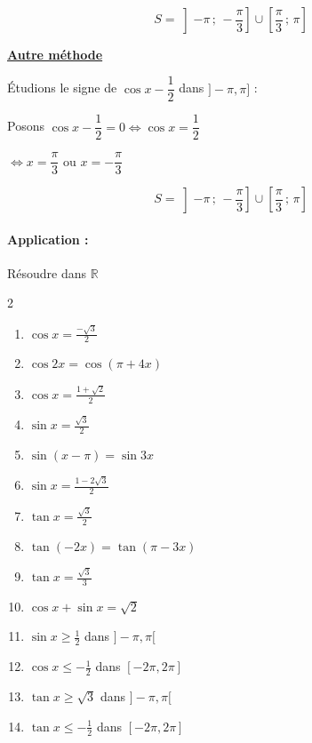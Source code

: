 \documentclass[12pt,a4paper]{article}
\begin{document}
\[
S = \left] -\pi\,;\, -\frac{\pi}{3} \right] \cup \left[ \frac{\pi}{3}\,;\, \pi \right]
\]

\begin{center}
    \underline{\textbf{\Large Autre méthode}}
\end{center}

\vspace{0.3cm}

\noindent Étudions le signe de $\cos x - \dfrac{1}{2}$ dans $]-\pi, \pi]$ :

\vspace{0.3cm}

Posons $\cos x - \dfrac{1}{2} = 0 \iff \cos x = \dfrac{1}{2}$

\hspace{3.4cm} $\iff x = \dfrac{\pi}{3} \text{ ou } x = -\dfrac{\pi}{3}$

\vspace{0.5cm}


\[
S = \left] -\pi \,;\, -\frac{\pi}{3} \right] \cup \left[ \frac{\pi}{3} \,;\, \pi \right]
\]

\paragraph{\Large\textbf{Application :}} Résoudre dans $\mathbb{R}$

\vspace{0.3cm}

\begin{multicols}{2}
\begin{enumerate}
    \item $\cos x = \frac{-\sqrt{3}}{2}$
    \item $\cos 2x = \cos(\pi + 4x)$
    \item $\cos x = \frac{1+\sqrt{2}}{2}$
    \item $\sin x = \frac{\sqrt{3}}{2}$
    \item $\sin(x - \pi) = \sin 3x$
    \item $\sin x = \frac{1-2\sqrt{3}}{2}$
    \item $\tan x = \frac{\sqrt{3}}{2}$
    \item $\tan(-2x) = \tan(\pi - 3x)$
    \item $\tan x = \frac{\sqrt{3}}{3}$
    \item $\cos x + \sin x = \sqrt{2}$
    \item $\sin x \ge \frac{1}{2}$ dans $]-\pi, \pi[$
    \item $\cos x \le -\frac{1}{2}$ dans $[-2\pi, 2\pi]$
    \item $\tan x \ge \sqrt{3}$ dans $]-\pi, \pi[$
    \item $\tan x \le -\frac{1}{2}$ dans $[-2\pi, 2\pi]$
\end{enumerate}
\end{multicols}
\end{document}
